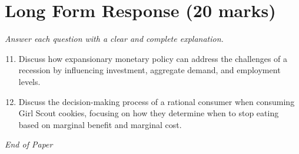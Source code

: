 \documentclass[12pt]{article}
\begin{document}
\section*{Long Form Response (20 marks)}
\textit{Answer each question with a clear and complete explanation.}
\begin{enumerate}[label=\arabic*.]
\setcounter{enumi}{10}
\item Discuss how expansionary monetary policy can address the challenges of a recession by influencing investment, aggregate demand, and employment levels.
\item Discuss the decision-making process of a rational consumer when consuming Girl Scout cookies, focusing on how they determine when to stop eating based on marginal benefit and marginal cost.
\end{enumerate}

\vfill
\noindent\textit{End of Paper}
\end{document}
